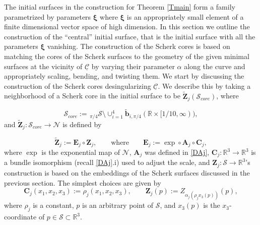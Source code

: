 \documentclass[12pt,namelimits,sumlimits]{amsart}
\theoremstyle{remark}
\numberwithin{equation}{section}
\begin{document}
The initial surfaces in the construction for Theorem \ref{Tmain}
form a family parametrized by parameters ${{\boldsymbol{\xi}}}$ where ${{\boldsymbol{\xi}}}$
is an appropriately small element of a finite dimensional vector space of high dimension.
In this section we outline the construction of the ``central'' initial surface,
that is the initial surface with all the parameters ${{\boldsymbol{\xi}}}$ vanishing.
The construction of the Scherk cores is based on
matching 
the cores of the Scherk surfaces
to the geometry of the given minimal surfaces at the vicinity of ${\underline{{\mathcal{C}}}}$
by varying their parameter $\alpha$ along the curve and 
appropriately scaling, bending, and twisting them.
We start by discussing the construction
of the Scherk cores desingularizing ${\underline{{\mathcal{C}}}}$.
We describe this by taking a neighborhood of a Scherk core in the initial surface to be
${\widetilde{\boldsymbol{Z}}}_j({{\mathcal{S}_{core}}})$,
where
\addtocounter{theorem}{1}
\begin{equation}
\label{EScore}
{{\mathcal{S}_{core}}}:=
{{{}_{\,\pi/4\!}\mathcal{S}}}\setminus\cup_{i=1}^4{\widetilde{\boldsymbol{b}}}_{i,\pi/4}({\mathbb{R}}\times[1/10,\infty)),
\end{equation}
and ${\widetilde{\boldsymbol{Z}}}_j:{{\mathcal{S}_{core}}}\to{{\mathcal{N}}}$ is defined by
\addtocounter{theorem}{1}
\begin{equation}
\label{EEjzero}
{\widetilde{\boldsymbol{Z}}}_j:={\boldsymbol{E}}_j\circ{\boldsymbol{Z}}_j,
\qquad
\text{where}
\qquad
{\boldsymbol{E}}_j:=\exp\circ{\boldsymbol{A}}_j\circ{\boldsymbol{C}}_j,
\end{equation}
where $\exp$ is the exponential map of ${{\mathcal{N}}}$,
${\boldsymbol{A}}_j$ was defined in \ref{DAj},
${\boldsymbol{C}}_j:{{{\mathbb{R}}^3}}\to{{{\mathbb{R}}^3}}$ is a bundle isomorphism (recall \ref{DAj}.i)
used to adjust the scale,
and ${\boldsymbol{Z}}_j:{{\mathcal{S}}}\to{{{\mathbb{R}}^3}}$'s construction is based on the embeddings of the
Scherk surfaces discussed in the previous section.
The simplest choices are given by
$$
{\boldsymbol{C}}_j(x_1,x_2,x_3):=\rho_j(x_1,x_2,x_3),
\qquad
{\boldsymbol{Z}}_j(p):=Z_{\alpha_j(\rho_j x_3(p))}(p),
$$
where $\rho_j$ is a constant, $p$ is an arbitrary point of ${{\mathcal{S}}}$,
and $x_3(p)$ is the $x_3$-coordinate of $p\in{{\mathcal{S}}}\subset{{{\mathbb{R}}^3}}$.
\end{document}
